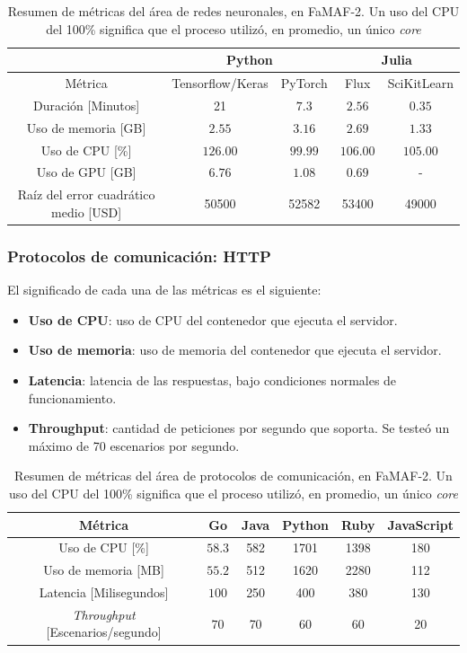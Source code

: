 \documentclass[11pt]{article}
\let\Oldsubsubsection\subsubsection
\renewcommand{\subsubsection}{\FloatBarrier\Oldsubsubsection}
\newcommand{\english}[1]{\textit{#1}}
\begin{document}
\begin{table}[H]
\centering
\begin{tabular}{|c|c|c|c|c|}
\hline
& \multicolumn{2}{c|}{Python} & \multicolumn{2}{c|}{Julia} \\ \hline
Métrica & Tensorflow/Keras & PyTorch & Flux & SciKitLearn \\ \hline
Duración [Minutos] & 21 & $7.3$ & $2.56$ & $0.35$ \\ \hline
Uso de memoria [GB] & $2.55$ & $3.16$ & $2.69$ & $1.33$ \\ \hline
Uso de CPU [\%] & $126.00$ & $99.99$& $106.00$& $105.00$\\ \hline
Uso de GPU [GB] & $6.76$ & $1.08$ & $0.69$ & - \\ \hline
Raíz del error cuadrático medio [USD] & 50500 & 52582 & 53400 & 49000 \\ \hline
\end{tabular}
\caption{Resumen de métricas del área de redes neuronales, en FaMAF-2. Un uso del CPU del 100\% significa que el proceso utilizó, en promedio, un único \english{core}}
\label{tab:nn:famaf_2}
\end{table}

\subsubsection{Protocolos de comunicación: HTTP}

El significado de cada una de las métricas es el siguiente:

\begin{itemize}
    \item \textbf{Uso de CPU}: uso de CPU del contenedor que ejecuta el servidor.
    \item \textbf{Uso de memoria}: uso de memoria del contenedor que ejecuta el servidor.
    \item \textbf{Latencia}: latencia de las respuestas, bajo condiciones normales de funcionamiento.
    \item \textbf{Throughput}: cantidad de peticiones por segundo que soporta. Se testeó un máximo de 70 escenarios por segundo.
\end{itemize}

\begin{table}[H]
\centering
\begin{tabular}{|c|c|c|c|c|c|}
\hline
Métrica       & Go   & Java & Python & Ruby & JavaScript \\ \hline
Uso de CPU [\%]         & $58.3$ & 582  & 1701   & 1398 & 180        \\ \hline
Uso de memoria [MB]   & $55.2$ & 512  & 1620   & 2280 & 112        \\ \hline
Latencia [Milisegundos]   & $100$  & 250  & 400    & 380  & 130        \\ \hline
\english{Throughput} [Escenarios/segundo] & $70$   & 70   & 60     & 60   & 20         \\ \hline
\end{tabular}
\caption{Resumen de métricas del área de protocolos de comunicación, en FaMAF-2. Un uso del CPU del 100\% significa que el proceso utilizó, en promedio, un único \english{core} }
\label{tab:http:famaf_1}
\end{table}
\end{document}
